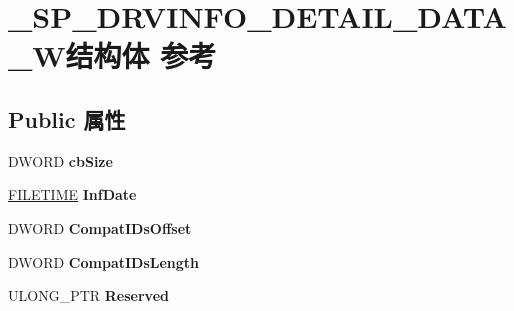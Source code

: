 \hypertarget{struct___s_p___d_r_v_i_n_f_o___d_e_t_a_i_l___d_a_t_a___w}{}\section{\+\_\+\+S\+P\+\_\+\+D\+R\+V\+I\+N\+F\+O\+\_\+\+D\+E\+T\+A\+I\+L\+\_\+\+D\+A\+T\+A\+\_\+\+W结构体 参考}
\label{struct___s_p___d_r_v_i_n_f_o___d_e_t_a_i_l___d_a_t_a___w}
\subsection*{Public 属性}
\begin{DoxyCompactItemize}
\item 
\mbox{\label{struct___s_p___d_r_v_i_n_f_o___d_e_t_a_i_l___d_a_t_a___w_a018cc94894c0f8b2bfd94d7d15be956c}} 
D\+W\+O\+RD {\bfseries cb\+Size}
\item 
\mbox{\label{struct___s_p___d_r_v_i_n_f_o___d_e_t_a_i_l___d_a_t_a___w_aba9e541000370af08df67c06d3ca15e1}} 
\hyperlink{struct___f_i_l_e_t_i_m_e}{F\+I\+L\+E\+T\+I\+ME} {\bfseries Inf\+Date}
\item 
\mbox{\label{struct___s_p___d_r_v_i_n_f_o___d_e_t_a_i_l___d_a_t_a___w_a83b285981c2ec803d02e9206e57f16cf}} 
D\+W\+O\+RD {\bfseries Compat\+I\+Ds\+Offset}
\item 
\mbox{\label{struct___s_p___d_r_v_i_n_f_o___d_e_t_a_i_l___d_a_t_a___w_a738ab15ecff1a43e4aede67921c12a58}} 
D\+W\+O\+RD {\bfseries Compat\+I\+Ds\+Length}
\item 
\mbox{\label{struct___s_p___d_r_v_i_n_f_o___d_e_t_a_i_l___d_a_t_a___w_aea48451e8b0c850204e6dc69181f6587}} 
U\+L\+O\+N\+G\+\_\+\+P\+TR {\bfseries Reserved}
\item 
\mbox{\label{struct___s_p___d_r_v_i_n_f_o___d_e_t_a_i_l___d_a_t_a___w_aecd7de55b3aacd0dc3dd7a3adbb42099}} 

\end{DoxyCompactItemize}
